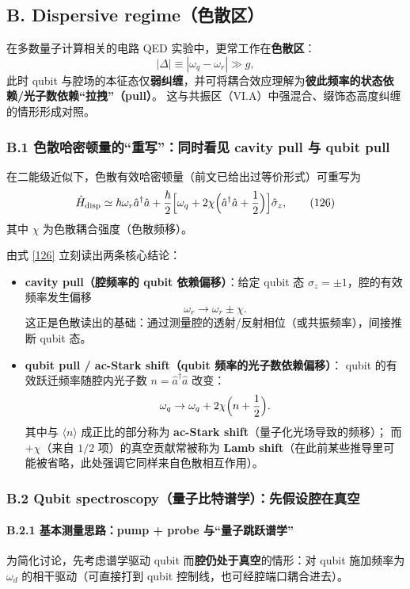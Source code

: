 \documentclass[12pt,a4paper,oneside]{ctexbook}
\let\oldparagraph\paragraph
\renewcommand{\paragraph}[1]{\oldparagraph{#1}\mbox{}}
\begin{document}
\subsection{B. Dispersive regime（色散区）}

在多数量子计算相关的电路 QED 实验中，更常工作在\textbf{色散区}：
\[
|\Delta|\equiv|\omega_q-\omega_r|\gg g,
\]
此时 qubit 与腔场的本征态仅\textbf{弱纠缠}，并可将耦合效应理解为\textbf{彼此频率的状态依赖/光子数依赖“拉拽”（pull）}。
这与共振区（VI.A）中强混合、缀饰态高度纠缠的情形形成对照。

\subsubsection{B.1 色散哈密顿量的“重写”：同时看见 cavity pull 与 qubit pull}

在二能级近似下，色散有效哈密顿量（前文已给出过等价形式）可重写为
\begin{equation}
\hat H_{\mathrm{disp}}
\simeq
\hbar\omega_r \hat a^\dagger \hat a
+
\frac{\hbar}{2}\Bigl[
\omega_q+2\chi\Bigl(\hat a^\dagger \hat a+\frac{1}{2}\Bigr)
\Bigr]\hat\sigma_z,
\tag{126}
\end{equation}
其中 $\chi$ 为色散耦合强度（色散频移）。

由式 \eqref{126} 立刻读出两条核心结论：

\begin{itemize}
  \item \textbf{cavity pull（腔频率的 qubit 依赖偏移）}：给定 qubit 态 $\sigma_z=\pm1$，腔的有效频率发生偏移
  \[
  \omega_r \to \omega_r \pm \chi.
  \]
  这正是色散读出的基础：通过测量腔的透射/反射相位（或共振频率），间接推断 qubit 态。

  \item \textbf{qubit pull / ac-Stark shift（qubit 频率的光子数依赖偏移）}：
  qubit 的有效跃迁频率随腔内光子数 $n=\hat a^\dagger\hat a$ 改变：
  \[
  \omega_q \to \omega_q + 2\chi\Bigl(n+\frac{1}{2}\Bigr).
  \]
  其中与 $\langle n\rangle$ 成正比的部分称为 \textbf{ac-Stark shift}（量子化光场导致的频移）；
  而 $+\chi$（来自 $1/2$ 项）的真空贡献常被称为 \textbf{Lamb shift}（在此前某些推导里可能被省略，此处强调它同样来自色散相互作用）。
\end{itemize}

\subsubsection{B.2 Qubit spectroscopy（量子比特谱学）：先假设腔在真空}

\paragraph{B.2.1 基本测量思路：pump + probe 与“量子跳跃谱学”}
为简化讨论，先考虑谱学驱动 qubit 而\textbf{腔仍处于真空}的情形：对 qubit 施加频率为 $\omega_d$ 的相干驱动（可直接打到 qubit 控制线，也可经腔端口耦合进去）。
\end{document}
